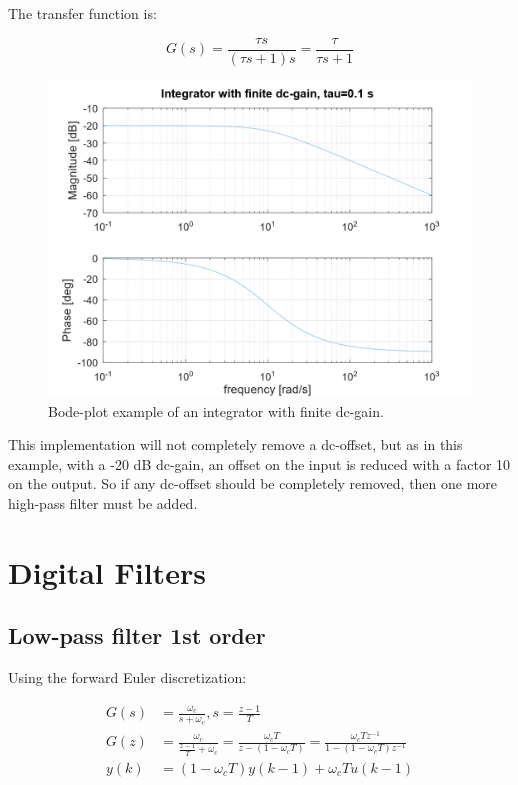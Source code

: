 \documentclass[]{book}
\begin{document}
The transfer function is:

\[
G(s) =  \frac{\tau s}{(\tau s + 1)s} = \frac{\tau}{\tau s + 1}
\label{eq:int1}
\]

\begin{figure}
\includegraphics[width=0.8\linewidth]{images/filters/integrator} \caption{Bode-plot example of an integrator with finite dc-gain.}\label{fig:unnamed-chunk-7}
\end{figure}

This implementation will not completely remove a dc-offset, but as in this example, with a -20 dB dc-gain, an offset on the input is reduced with a factor 10 on the output. So if any dc-offset should be completely removed, then one more high-pass filter must be added.

\hypertarget{digital-filters}{%
\section{Digital Filters}\label{digital-filters}}

\hypertarget{low-pass-filter-1st-order-1}{%
\subsection{Low-pass filter 1st order}\label{low-pass-filter-1st-order-1}}

Using the forward Euler discretization:

\[
\begin{aligned}
G(s) &=  \frac{\omega_c}{s + \omega_c}, s=\frac{z-1}{T} \\
G(z) &=  \frac{\omega_c}{\frac{z-1}{T} + \omega_c} = \frac{\omega_c T}{z- (1 - \omega_c T)} 
= \frac{\omega_c T z^{-1}}{1- (1 - \omega_c T)z^{-1}} \\
y(k) &=   (1 - \omega_c T)y(k-1)   + \omega_c T u(k-1) \\
\end{aligned}
\label{eq:dlpf1}
\]
\end{document}
